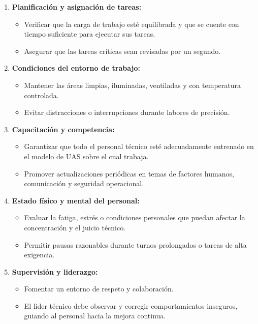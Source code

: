 \begin{enumerate}
    \item \textbf{Planificación y asignación de tareas:}
        \begin{itemize}
            \item Verificar que la carga de trabajo esté equilibrada y que se cuente con tiempo suficiente para ejecutar sus tareas.

            \item Asegurar que las tareas críticas sean revisadas por un segundo.
        \end{itemize}

    \item \textbf{Condiciones del entorno de trabajo:}
        \begin{itemize}
            \item Mantener las áreas limpias, iluminadas, ventiladas y con temperatura controlada.

            \item Evitar distracciones o interrupciones durante labores de precisión.
        \end{itemize}

    \item \textbf{Capacitación y competencia:}
        \begin{itemize}
            \item Garantizar que todo el personal técnico esté adecuadamente entrenado en el modelo de UAS sobre el cual trabaja.

            \item Promover actualizaciones periódicas en temas de factores humanos, comunicación y seguridad operacional.
        \end{itemize}

    \item \textbf{Estado físico y mental del personal:}
        \begin{itemize}
            \item Evaluar la fatiga, estrés o condiciones personales que puedan afectar la concentración y el juicio técnico.

            \item Permitir pausas razonables durante turnos prolongados o tareas de alta exigencia.
        \end{itemize}

    \item \textbf{Supervisión y liderazgo:}
        \begin{itemize}
            \item Fomentar un entorno de respeto y colaboración.

            \item El líder técnico debe observar y corregir comportamientos inseguros, guiando al personal hacia la mejora continua.
        \end{itemize}

\end{enumerate}

